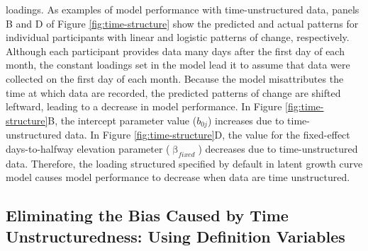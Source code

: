 \documentclass[
12pt, %
twoside,
english]{guelphthesis}
\begin{document}
\noindent loadings. As examples of model performance with time-unstructured data, panels B and D of Figure \ref{fig:time-structure} show the predicted and actual patterns for individual participants with linear and logistic patterns of change, respectively. Although each participant provides data many days after the first day of each month, the constant loadings set in the model lead it to assume that data were collected on the first day of each month. Because the model misattributes the time at which data are recorded, the predicted patterns of change are shifted leftward, leading to a decrease in model performance. In Figure \ref{fig:time-structure}B, the intercept parameter value (\(b_{0j}\)) increases due to time-unstructured data. In Figure \ref{fig:time-structure}D, the value for the fixed-effect days-to-halfway elevation parameter (\(\upbeta_{fixed}\)) decreases due to time-unstructured data. Therefore, the loading structured specified by default in latent growth curve model causes model performance to decrease when data are time unstructured.

\hypertarget{def-variables}{%
\subsection{Eliminating the Bias Caused by Time Unstructuredness: Using Definition Variables}\label{def-variables}}
\end{document}

